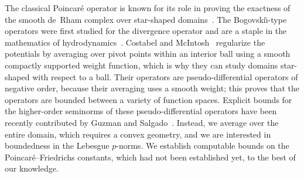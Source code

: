\begin{remark}
    The classical Poincar\'e operator is known for its role in proving the exactness of the smooth de~Rham complex over star-shaped domains~\cite{lee2012smooth}.
	The Bogovski\u{\i}-type operators were first studied for the divergence operator and are a staple in the mathematics of hydrodynamics~\cite{bogovskii1979solution}.
    Costabel and McIntosh~\cite{costabel2010bogovskiui} regularize the potentials by averaging over pivot points within an interior ball using a smooth compactly supported weight function, 
    which is why they can study domains star-shaped with respect to a ball. 
    Their operators are pseudo-differential operators of negative order, 
    because their averaging uses a smooth weight; this proves that the operators are bounded between a variety of function spaces. 
    Explicit bounds for the higher-order seminorms of these pseudo-differential operators 
    have been recently contributed by Guzman and Salgado~\cite{guzman2021estimation}. 
    Instead, we average over the entire domain, which requires a convex geometry, 
	and we are interested in boundedness in the Lebesgue $p$-norms. 
    We establish computable bounds on the Poincar\'e--Friedrichs constants,
	which had not been established yet, to the best of our knowledge. 
\end{remark}

